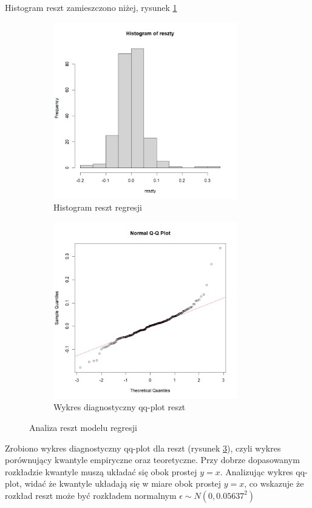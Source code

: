 \documentclass[a4paper,11pt]{article}
\begin{document}
Histogram reszt zamieszczono niżej, rysunek \ref{fig:hist_reszty}
\begin{figure}
  \begin{subfigure}{0.5\textwidth}
    \includegraphics[width=8cm]{hist_reszty.png}
    \caption{Histogram reszt regresji}
    \label{fig:hist_reszty}
  \end{subfigure}%
  \begin{subfigure}{0.5\textwidth}
    \includegraphics[width=8cm]{qq_reszty.png}
    \caption{Wykres diagnostyczny qq-plot reszt}
    \label{fig:qq_reszty}
  \end{subfigure}
  \caption{Analiza reszt modelu regresji}
\end{figure}

Zrobiono wykres diagnostyczny qq-plot dla reszt (rysunek \ref{fig:qq_reszty}), czyli wykres porównujący kwantyle empiryczne oraz teoretyczne. Przy dobrze dopasowanym rozkładzie kwantyle muszą układać się obok prostej $y=x$. Analizując wykres qq-plot, widać że kwantyle układają się w miare obok prostej $y=x$, co wskazuje że rozkład reszt może być rozkładem normalnym $\epsilon \sim N(0, 0.05637^2)$
\end{document}

